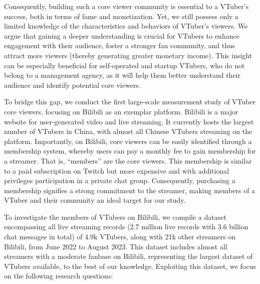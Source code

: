 Consequently, building such a core viewer community is essential to a VTuber's success, both in terms of fame and monetization. Yet, we still possess only a limited knowledge of the characteristics and behaviors of VTuber's viewers. We argue that gaining a deeper understanding is crucial for VTubers to enhance engagement with their audience, foster a stronger fan community, and thus attract more viewers (thereby generating greater monetary income). This insight can be especially beneficial for self-operated and startup VTubers, who do not belong to a management agency, as it will help them better understand their audience and identify potential core viewers.

To bridge this gap, we conduct the first large-scale measurement study of VTuber core viewers, focusing on Bilibili as an exemplar platform. 
Bilibili is a major website for user-generated video and live streaming. It currently hosts the largest number of VTubers in China, with almost all Chinese VTubers streaming on the platform. 
% 
Importantly, on Bilibili, core viewers can be easily identified through a membership system, whereby users can pay a monthly fee to gain membership for a streamer. That is, ``members'' are the core viewers.
This membership is similar to a paid subscription on Twitch but more expensive and with additional privileges \eg participation in a private chat group. 
Consequently, purchasing a membership signifies a strong commitment to the streamer, making members of a VTuber and their community an ideal target for our study.

To investigate the members of VTubers on Bilibili, we compile a dataset encompassing all live streaming records (2.7 million live records with 3.6 billion chat messages in total) of 4.9k VTubers, along with 21k other streamers on Bilibili, from June 2022 to August 2023. This dataset includes almost all streamers with a moderate fanbase on Bilibili, representing the largest dataset of VTubers available, to the best of our knowledge.
Exploiting this dataset, we focus on the following research questions:


